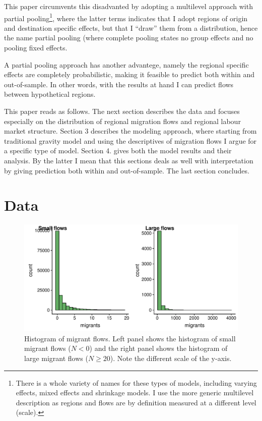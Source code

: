 \documentclass[fleqn,10pt]{SelfArx} %
\begin{document}
        This paper circumvents this disadvanted by adopting a
        multilevel approach with partial pooling\footnote{There is a
          whole variety of names for these types of models, including
          varying effects, mixed effects and shrinkage models. I use
          the more generic multilevel description as regions and flows
          are by definition measured at a different level (scale).},
        where the latter terms indicates that I adopt regions of
        origin and destination specific effects, but that I ``draw''
        them from a distribution, hence the name partial pooling
        (where complete pooling states no group effects and no pooling
        fixed effects.

        A partial pooling approach has another advantege, namely the
        regional specific effects are completely probabilistic, making
        it feasible to predict both within and out-of-sample. In other
        words, with the results at hand I can predict flows between
        hypothetical regions.

        This paper reads as follows. The next section describes the
        data and focuses especially on the distribution of regional
        migration flows and regional labour market structure. Section
        3 describes the modeling approach, where starting from
        traditional gravity model and using the descriptives of
        migration flows I argue for a specific type of model. Section
        4. gives both the model results and their analysis. By the
        latter I mean that this sections deals as well with
        interpretation by giving prediction both within and
        out-of-sample. The last section concludes.

        \section{Data}

              \begin{figure}[ht!]\centering %
          \includegraphics[width=0.8\linewidth]{../fig/hist_mig.pdf}
          \caption{Histogram of migrant flows. Left panel shows the
            histogram of small migrant flows ($N<0$) and the right
            panel shows the histogram of large migrant flows
            ($N \geq 20$). Note the different scale of the y-axis.}
          \label{fig:hist_mig}
        \end{figure}
\end{document}
